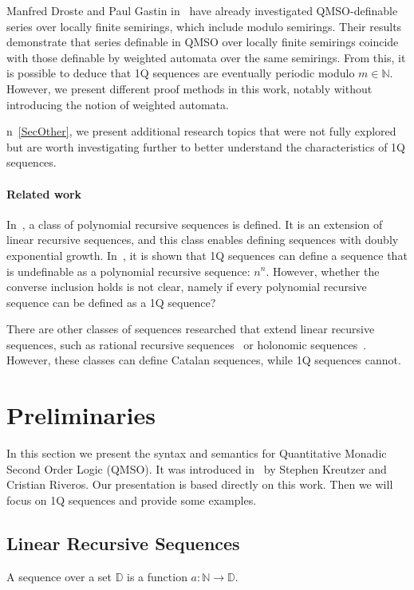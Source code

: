 \documentclass[12pt]{article}
\theoremstyle{definition}
\begin{document}
Manfred Droste and Paul Gastin in~\cite{DrosteG07} have already investigated QMSO-definable series over locally finite semirings, which include modulo semirings. Their results demonstrate that series definable in QMSO over locally finite semirings coincide with those definable by weighted automata over the same semirings. From this, it is possible to deduce that 1Q sequences are eventually periodic modulo $m \in \mathbb{N}$. However, we present different proof methods in this work, notably without introducing the notion of weighted automata.

n~\cref{SecOther}, we present additional research topics that were not fully explored but are worth investigating further to better understand the characteristics of 1Q sequences.

\paragraph*{Related work}
In~\cite{CadilhacMPPS20}, a class of polynomial recursive sequences is defined. It is an extension of linear recursive sequences, and this class enables defining sequences with doubly exponential growth. In~\cite{CadilhacMPPS20}, it is shown that 1Q sequences can define a sequence that is undefinable as a polynomial recursive sequence: $n^n$. However, whether the converse inclusion holds is not clear, namely if every polynomial recursive sequence can be defined as a 1Q sequence?

There are other classes of sequences researched that extend linear recursive sequences, such as rational recursive sequences~\cite{ClementeDMP23} or holonomic sequences~\cite{KenisonKLLMOW021}. However, these classes can define Catalan sequences, while 1Q sequences cannot.

\section{Preliminaries}
In this section we present the syntax and semantics for Quantitative Monadic Second Order Logic (QMSO). It was introduced in~\cite{KreutzerR13} by Stephen Kreutzer and Cristian Riveros. Our presentation is based directly on this work. Then we will focus on 1Q sequences and provide some examples.

\subsection{Linear Recursive Sequences}
A sequence over a set $\mathbb{D}$ is a function $a : \mathbb{N} \rightarrow \mathbb{D}$.
\end{document}
